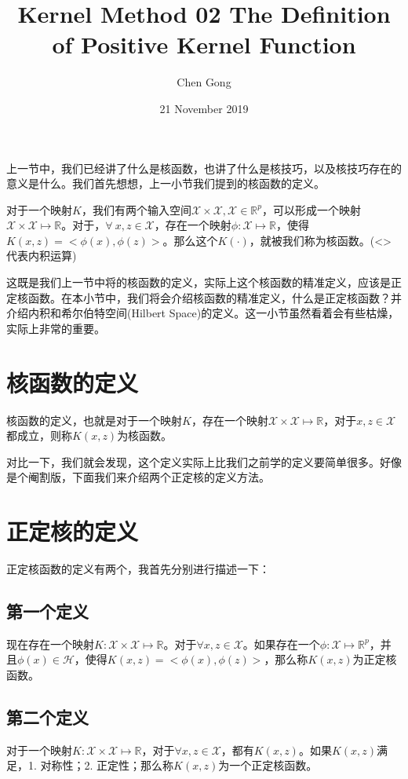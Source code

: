 \documentclass[a4paper]{article}
\title{Kernel Method 02 The Definition of Positive Kernel Function}
\author{Chen Gong}
\date{21 November 2019}
\begin{document}
\maketitle
上一节中，我们已经讲了什么是核函数，也讲了什么是核技巧，以及核技巧存在的意义是什么。我们首先想想，上一小节我们提到的核函数的定义。

对于一个映射$K$，我们有两个输入空间$\mathcal{X}\times\mathcal{X},\mathcal{X}\in\mathbb{R}^p$，可以形成一个映射$\mathcal{X}\times \mathcal{X}\mapsto\mathbb{R}$。对于，$\forall\ x,z \in \mathcal{X}$，存在一个映射$\phi:\mathcal{X}\mapsto \mathbb{R}$，使得$K(x,z)=<\phi(x),\phi(z)>$。那么这个$K(\cdot)$，就被我们称为核函数。(<>代表内积运算)

这既是我们上一节中将的核函数的定义，实际上这个核函数的精准定义，应该是正定核函数。在本小节中，我们将会介绍核函数的精准定义，什么是正定核函数？并介绍内积和希尔伯特空间(Hilbert Space)的定义。这一小节虽然看着会有些枯燥，实际上非常的重要。

\section{核函数的定义}
核函数的定义，也就是对于一个映射$K$，存在一个映射$\mathcal{X}\times\mathcal{X}\mapsto \mathbb{R}$，对于$x,z\in \mathcal{X}$都成立，则称$K(x,z)$为核函数。

对比一下，我们就会发现，这个定义实际上比我们之前学的定义要简单很多。好像是个阉割版，下面我们来介绍两个正定核的定义方法。

\section{正定核的定义}
正定核函数的定义有两个，我首先分别进行描述一下：

\subsection{第一个定义}
现在存在一个映射$K:\mathcal{X}\times\mathcal{X}\mapsto\mathbb{R}$。对于$\forall x,z \in \mathcal{X}$。如果存在一个$\phi:\mathcal{X}\mapsto \mathbb{R}^p$，并且$\phi(x)\in\mathcal{H}$，使得$K(x,z) = <\phi(x),\phi(z)>$，那么称$K(x,z)$为正定核函数。

\subsection{第二个定义}
对于一个映射$K:\mathcal{X}\times\mathcal{X}\mapsto\mathbb{R}$，对于$\forall x,z\in \mathcal{X}$，都有$K(x,z)$。如果$K(x,z)$满足，1. 对称性；2. 正定性；那么称$K(x,z)$为一个正定核函数。
\end{document}

